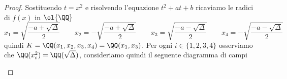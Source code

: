 \documentclass[11pt]{scrartcl}
\begin{document}
\begin{proof}
    Sostituendo $t = x^2$ e risolvendo l'equazione $t^2 + at + b$ ricaviamo
    le radici di $f(x)$ in $\ol{\QQ}$
    \[
        x_1 = \sqrt{\frac{-a + \sqrt{\Delta}}{2}}\qquad 
        x_2 = -\sqrt{\frac{-a + \sqrt{\Delta}}{2}}\qquad
        x_3 = \sqrt{\frac{-a - \sqrt{\Delta}}{2}}\qquad
        x_4 = -\sqrt{\frac{-a - \sqrt{\Delta}}{2}}
    \]
    quindi $K = \QQ(x_1, x_2, x_3, x_4) = \QQ(x_1, x_3)$. Per ogni $i \in
    \{1, 2, 3, 4\}$ osserviamo che $\QQ(x_i^2) = \QQ(\sqrt{\Delta})$,
    consideriamo quindi il seguente diagramma di campi 
    \begin{center}
\end{center}
\end{proof}
\end{document}
